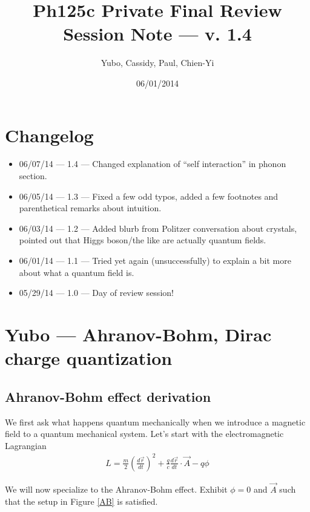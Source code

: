 \documentclass[12pt]{article}
\newcommand{\rd}[2]{\frac{d#1}{d#2}}
\begin{document}
\pagestyle{fancy}
\cfoot{\thepage/\pageref{LastPage}}

\title{Ph125c Private Final Review Session Note --- v. 1.4}
\author{Yubo, Cassidy, Paul, Chien-Yi}
\date{06/01/2014}

\maketitle

\tableofcontents

\section{Changelog}

\begin{itemize}
    \item 06/07/14 --- 1.4 --- Changed explanation of ``self interaction'' in phonon section.
    \item 06/05/14 --- 1.3 --- Fixed a few odd typos, added a few footnotes and parenthetical remarks about intuition.
    \item 06/03/14 --- 1.2 --- Added blurb from Politzer conversation about crystals, pointed out that Higgs boson/the like are actually quantum fields.
    \item 06/01/14 --- 1.1 --- Tried yet again (unsuccessfully) to explain a bit more about what a quantum field is.
    \item 05/29/14 --- 1.0 --- Day of review session!
\end{itemize}
\section{Yubo --- Ahranov-Bohm, Dirac charge quantization}

\subsection{Ahranov-Bohm effect derivation}

We first ask what happens quantum mechanically when we introduce a magnetic field to a quantum mechanical system. Let's start with the electromagnetic Lagrangian
\begin{align}
    L = \frac{m}{2}\left( \rd{\vec{r}}{t} \right)^2 + \frac{q}{c}\rd{\vec{r}}{t} \cdot \vec{A} - q\phi
\end{align}

We will now specialize to the Ahranov-Bohm effect. Exhibit $\phi = 0$ and $\vec{A}$ such that the setup in Figure \ref{AB} is satisfied.
\end{document}
